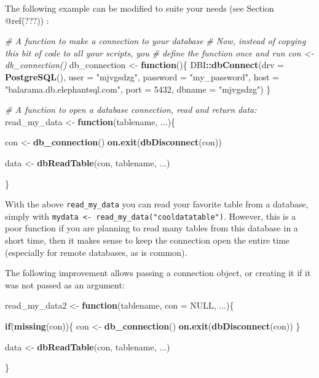 \documentclass[]{book}
\newenvironment{Shaded}{\begin{snugshade}}{\end{snugshade}}
\newcommand{\CommentTok}[1]{\textcolor[rgb]{0.56,0.35,0.01}{\textit{#1}}}
\newcommand{\ControlFlowTok}[1]{\textcolor[rgb]{0.13,0.29,0.53}{\textbf{#1}}}
\newcommand{\DataTypeTok}[1]{\textcolor[rgb]{0.13,0.29,0.53}{#1}}
\newcommand{\DecValTok}[1]{\textcolor[rgb]{0.00,0.00,0.81}{#1}}
\newcommand{\KeywordTok}[1]{\textcolor[rgb]{0.13,0.29,0.53}{\textbf{#1}}}
\newcommand{\NormalTok}[1]{#1}
\newcommand{\OperatorTok}[1]{\textcolor[rgb]{0.81,0.36,0.00}{\textbf{#1}}}
\newcommand{\OtherTok}[1]{\textcolor[rgb]{0.56,0.35,0.01}{#1}}
\newcommand{\StringTok}[1]{\textcolor[rgb]{0.31,0.60,0.02}{#1}}
\begin{document}
The following example can be modified to suite your needs (see Section @ref(???)) :

\begin{Shaded}
\begin{Highlighting}[]
\CommentTok{# A function to make a connection to your database}
\CommentTok{# Now, instead of copying this bit of code to all your scripts, you}
\CommentTok{# define the function once and run con <- db_connection()}
\NormalTok{db_connection <-}\StringTok{ }\ControlFlowTok{function}\NormalTok{()\{}
\NormalTok{  DBI}\OperatorTok{::}\KeywordTok{dbConnect}\NormalTok{(}\DataTypeTok{drv =} \KeywordTok{PostgreSQL}\NormalTok{(),}
                 \DataTypeTok{user =} \StringTok{"mjvgsdzg"}\NormalTok{,}
                 \DataTypeTok{password =} \StringTok{"my_password"}\NormalTok{,}
                 \DataTypeTok{host =} \StringTok{"balarama.db.elephantsql.com"}\NormalTok{,}
                 \DataTypeTok{port =} \DecValTok{5432}\NormalTok{,}
                 \DataTypeTok{dbname =} \StringTok{"mjvgsdzg"}\NormalTok{)}
\NormalTok{\}}


\CommentTok{# A function to open a database connection, read and return data:}
\NormalTok{read_my_data <-}\StringTok{ }\ControlFlowTok{function}\NormalTok{(tablename, ...)\{}
  
\NormalTok{  con <-}\StringTok{ }\KeywordTok{db_connection}\NormalTok{()}
  \KeywordTok{on.exit}\NormalTok{(}\KeywordTok{dbDisconnect}\NormalTok{(con))}
  
\NormalTok{  data <-}\StringTok{ }\KeywordTok{dbReadTable}\NormalTok{(con, tablename, ...)}
  
\NormalTok{\}}
\end{Highlighting}
\end{Shaded}

With the above \texttt{read\_my\_data} you can read your favorite table from a database, simply with \texttt{mydata\ \textless{}-\ read\_my\_data("cooldatatable")}. However, this is a poor function if you are planning to read many tables from this database in a short time, then it makes sense to keep the connection open the entire time (especially for remote databases, as is common).

The following improvement allows passing a connection object, or creating it if it was not passed as an argument:

\begin{Shaded}
\begin{Highlighting}[]
\NormalTok{read_my_data2 <-}\StringTok{ }\ControlFlowTok{function}\NormalTok{(tablename, }\DataTypeTok{con =} \OtherTok{NULL}\NormalTok{, ...)\{}
  
  \ControlFlowTok{if}\NormalTok{(}\KeywordTok{missing}\NormalTok{(con))\{}
\NormalTok{    con <-}\StringTok{ }\KeywordTok{db_connection}\NormalTok{()}
    \KeywordTok{on.exit}\NormalTok{(}\KeywordTok{dbDisconnect}\NormalTok{(con))}
\NormalTok{  \}}
  
\NormalTok{  data <-}\StringTok{ }\KeywordTok{dbReadTable}\NormalTok{(con, tablename, ...)}
  
\NormalTok{\}}
\end{Highlighting}
\end{Shaded}
\end{document}
